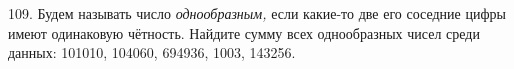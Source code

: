 109. Будем называть число {\it однообразным,} если какие-то две его соседние цифры имеют одинаковую чётность. Найдите сумму всех однообразных чисел среди данных: 101010, 104060, 694936, 1003, 143256.\\

